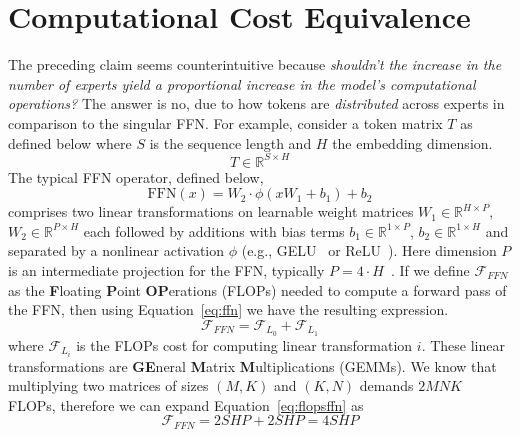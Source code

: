 \section{Computational Cost Equivalence}\label{sec:comoutational-cost-equivalence}
The preceding claim seems counterintuitive because \emph{shouldn't the increase in the number of experts
yield a proportional increase in the model's computational operations?}
The answer is no, due to how tokens are \emph{distributed} across experts in comparison to the singular FFN.
For example, consider a token matrix $T$ as defined below where $S$ is the sequence length and $H$
the embedding dimension.
\[
    T \in \mathbb{R}^{S \times H}
\]
The typical FFN operator, defined below,
\begin{equation}\label{eq:ffn}
\textrm{FFN}(x) = W_2 \cdot \phi(x W_1 + b_1) + b_2
\end{equation}
comprises two linear transformations on learnable weight matrices
$W_1\in \mathbb{R}^{H \times P}$, $W_2 \in \mathbb{R}^{P \times H}$ each followed by additions with bias terms
$b_1 \in \mathbb{R}^{1 \times P}$, $b_2 \in \mathbb{R}^{1 \times H}$ and separated by a
nonlinear activation $\phi$ (e.g., GELU~\cite{hendrycks2023gaussianerrorlinearunits} or
ReLU~\cite{10.5555/3104322.3104425}).
Here dimension $P$ is an intermediate projection for the FFN\@, typically $P = 4\cdot H$~\cite{NEURIPS2024_9f2b171f}.
If we define $\mathcal{F}_{FFN}$ as the \textbf{F}loating \textbf{P}oint \textbf{OP}erations (FLOPs)
needed to compute a forward pass of the FFN, then using Equation~\ref{eq:ffn} we have the resulting expression.
\begin{equation}\label{eq:flopsffn}
\mathcal{F}_{FFN} = \mathcal{F}_{L_0} + \mathcal{F}_{L_1}
\end{equation}
where $\mathcal{F}_{L_i}$ is the FLOPs cost for computing linear transformation $i$.
These linear transformations are \textbf{GE}neral \textbf{M}atrix \textbf{M}ultiplications (GEMMs).
We know that multiplying two matrices of sizes $(M, K)$ and $(K, N)$ demands $2MNK$ FLOPs,
therefore we can expand Equation~\ref{eq:flopsffn} as
\begin{equation}\label{eq:flopsffn2}
\mathcal{F}_{FFN} = 2SHP + 2SHP = 4SHP
\end{equation}

